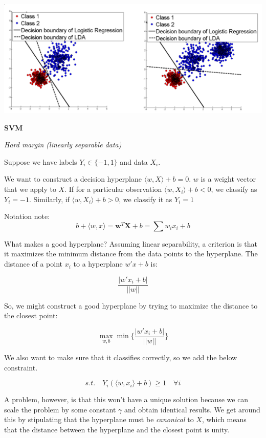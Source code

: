 \documentclass{minimal}
\begin{document}
\includegraphics[scale=0.25]{log}

\medskip

\textbf{SVM}

\smallskip

\textit{Hard margin (linearly separable data)}

Suppose we have labels $Y_i \in \{-1,1\}$ and data $X_i$. 

We want to construct a decision hyperplane $\langle w, X \rangle + b= 0$. $w$ is
a weight vector that we apply to $X$. If for a particular observation $\langle w, X_i \rangle + b < 0$, we
classify as $Y_i=-1$. Similarly, if $\langle w, X_i \rangle + b > 0$, we
classify it as $Y_i = 1$

Notation note:
$$b + \langle w, x \rangle = \mathbf{w}^T\mathbf{X} + b = \sum w_ix_i + b$$ 

What makes a good hyperplane? Assuming linear separability, a criterion is that
it maximizes the minimum distance from the data points to the hyperplane. The
distance of a point $x_i$ to a hyperplane $w'x + b$ is:

$$
\frac{|w'x_i + b|}{||w||}
$$

So, we might construct a good hyperplane by trying to maximize the distance to
the closest point:

$$
\max_{w, b} \min\{\frac{|w'x_i + b|}{||w||}\}
$$

We also want to make sure that it classifies correctly, so we add the
below constraint. 

$$
s.t. \quad Y_i(\langle w, x_i \rangle + b) \geq 1 \quad \forall i
$$

A problem, however, is that this won't have a unique solution because we can
scale the problem by some constant $\gamma$ and obtain identical results. We get
around this by stipulating that the hyperplane must be \textit{canonical}
to $X$, which means that the distance between the hyperplane and the closest
point is unity.
\end{document}
